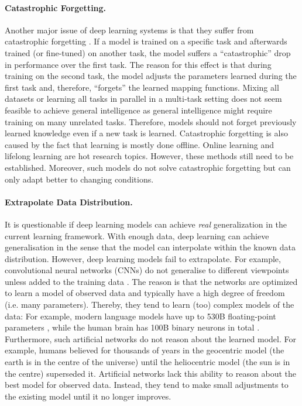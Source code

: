 \paragraph{Catastrophic Forgetting.} Another major issue of deep learning systems is that they suffer from catastrophic forgetting \cite{kirkpatrick_overcoming_2017, liu_overcoming_2021}.
If a model is trained on a specific task and afterwards trained (or fine-tuned) on another task, the model suffers a ``catastrophic'' drop in performance over the first task.
The reason for this effect is that during training on the second task, the model adjusts the parameters learned during the first task and, therefore, ``forgets'' the learned mapping functions.
Mixing all datasets or learning all tasks in parallel in a multi-task setting  does not seem feasible to achieve general intelligence as general intelligence might require training on many unrelated tasks. Therefore, models should not forget previously learned knowledge even if a new task is learned.
Catastrophic forgetting is also caused by the fact that learning is mostly done offline.
Online learning  and lifelong learning  are hot research topics.
However, these methods still need to be established. Moreover, such models do not solve catastrophic forgetting but can only adapt better to changing conditions.

\paragraph{Extrapolate Data Distribution.} It is questionable if deep learning models can achieve \emph{real} generalization in the current learning framework.
With enough data, deep learning can achieve generalisation in the sense that the model can interpolate within the known data distribution.
However, deep learning models fail to extrapolate.
For example, convolutional neural networks (CNNs) do not generalise to different viewpoints unless added to the training data .
The reason is that the networks are optimized to learn a model of observed data and typically have a high degree of freedom (i.e. many parameters).
Thereby, they tend to learn (too) complex models of the data: For example, modern language models have up to 530B floating-point parameters \cite{smith_using_2022}, while the human brain has 100B binary neurons in total \cite{herculano-houzel_human_2009}.
Furthermore, such artificial networks do not reason about the learned model. For example, humans believed for thousands of years in the geocentric model (the earth is in the centre of the universe) until the heliocentric model (the sun is in the centre) superseded it. Artificial networks lack this ability to reason about the best model for observed data. Instead, they tend to make small adjustments to the existing model until it no longer improves.

